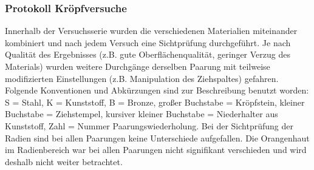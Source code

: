 \documentclass[12pt,a4paper,parskip]{scrartcl}
\begin{document}
\subsubsection{Protokoll Kröpfversuche}
Innerhalb der Versuchsserie wurden die verschiedenen Materialien miteinander kombiniert und nach jedem Versuch eine Sichtprüfung durchgeführt. Je nach Qualität des Ergebnisses (z.B. gute Oberflächenqualität, geringer Verzug des Materials) wurden weitere Durchgänge derselben Paarung mit teilweise modifizierten Einstellungen (z.B. Manipulation des Ziehspaltes) gefahren. Folgende Konventionen und Abkürzungen sind zur Beschreibung benutzt worden: S = Stahl, K = Kunststoff, B = Bronze, großer Buchstabe = Kröpfstein, kleiner Buchstabe = Ziehstempel, kursiver kleiner Buchstabe = Niederhalter aus Kunststoff, Zahl = Nummer Paarungswiederholung. Bei der Sichtprüfung der Radien sind bei allen Paarungen keine Unterschiede aufgefallen. Die Orangenhaut im Radienbereich war bei allen Paarungen nicht signifikant verschieden und wird deshalb nicht weiter betrachtet.
\end{document}
